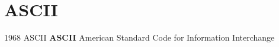 \documentclass[../index.tex]{subfiles}
\begin{document}
\renewcommand{\sectiontitle}{ASCII}
\section{\sectiontitle}
%

\renewcommand{\currenttitle}{1968 \textendash{} ASCII}
\begin{frame}{\currenttitle}
%
  \textbf{ASCII} \textendash{} American Standard Code for Information Interchange
\end{frame}
\end{document}
